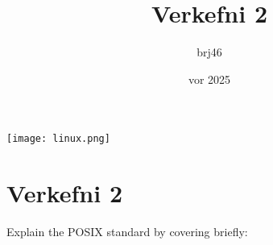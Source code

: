 \documentclass{article}
\title{Verkefni 2}
\author{brj46 }
\date{vor 2025}
\begin{document}
\maketitle


\vspace{5em}

\begin{center}
    \texttt{[image: linux.png]}
\end{center}

\newpage

\section{Verkefni 2}

Explain the POSIX standard
by covering briefly:
\end{document}
